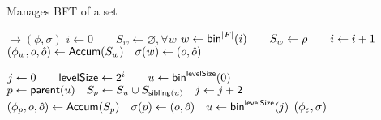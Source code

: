 \begin{algorithm}[H]
    \begin{algorithmic}[1]
    \caption{\small Manages BFT of a set}
    \label{a:at:createfrontier}
    \label{a:at:provefrontier}
    \label{a:at:verfrontier}
    \footnotesize
     $\rightarrow (\phi,\sigma)$
        \State $i\gets 0\qquad S_w\gets \varnothing, \forall w$
         
            \State $w\gets \mathsf{bin}^{|F|}(i)\qquad S_w \gets \rho\qquad i\gets i+1$
            \State $(\phi_w,o,\hat{o}) \gets \mathsf{Accum}(S_w)\quad \sigma(w) \gets (o, \hat{o})$
        \EndFor

         
            \State $j\gets 0\qquad \mathsf{levelSize} \gets 2^i\qquad u\gets \mathsf{bin}^{\mathsf{levelSize}}(0)$
             
                \State $p \gets \mathsf{parent}(u)\quad S_p \gets S_u\cup S_{\mathsf{sibling}(u)} \quad j \gets j+2$
                \State $(\phi_p,o,\hat{o}) \gets \mathsf{Accum}(S_p)\quad \sigma(p) \gets (o, \hat{o})\quad u \gets \mathsf{bin}^\mathsf{levelSize}(j)$
            \EndWhile
        \EndFor
        \State \Return $( \phi_\varepsilon, \sigma)$
    \EndFunction


\end{algorithmic}
\end{algorithm}
